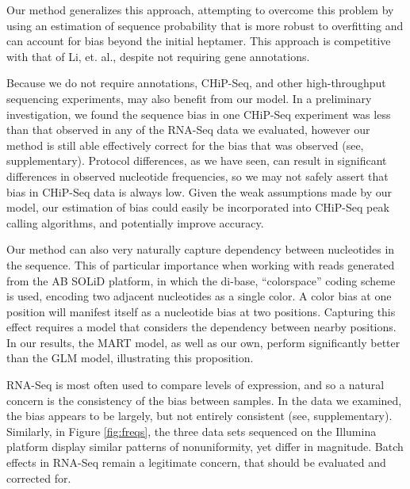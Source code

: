 \documentclass{bioinfo}
\begin{document}
Our method generalizes this approach, attempting to overcome this problem by
using an estimation of sequence probability that is more robust to overfitting
and can account for bias beyond the initial heptamer. This approach is
competitive with that of Li, et. al., despite not requiring gene annotations.

Because we do not require annotations, CHiP-Seq, and other high-throughput
sequencing experiments, may also benefit from our model. In a preliminary
investigation, we found the sequence bias in one CHiP-Seq experiment
\cite{Cao2010} was less than that observed in any of the RNA-Seq data we
evaluated, however our method is still able effectively correct for the bias
that was observed (see, supplementary). Protocol differences, as we have seen,
can result in significant differences in observed nucleotide frequencies, so we
may not safely assert that bias in CHiP-Seq data is always low.  Given the weak
assumptions made by our model, our estimation of bias could easily be
incorporated into CHiP-Seq peak calling algorithms, and potentially improve
accuracy.

Our method can also very naturally capture dependency between nucleotides in the
sequence. This of particular importance when working with reads generated from
the AB SOLiD platform, in which the di-base, ``colorspace'' coding scheme is
used, encoding two adjacent nucleotides as a single color. A color bias at one
position will manifest itself as a nucleotide bias at two positions. Capturing
this effect requires a model that considers the dependency between nearby
positions. In our results, the MART model, as well as our own, perform
significantly better than the GLM model, illustrating this proposition.

RNA-Seq is most often used to compare levels of expression, and so a natural
concern is the consistency of the bias between samples. In the data we examined,
the bias appears to be largely, but not entirely consistent (see,
supplementary). Similarly, in Figure \ref{fig:freqs}, the three data sets
sequenced on the Illumina platform display similar patterns of nonuniformity,
yet differ in magnitude. Batch effects in RNA-Seq remain a legitimate concern,
that should be evaluated and corrected for.




\end{document}
